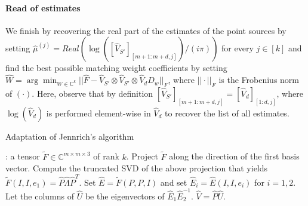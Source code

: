 \paragraph{Read of estimates} We finish by recovering the real part of the estimates of the point sources by setting $\widehat{\mu}^{(j)}=Real(\log([\widehat{V}_{S'}]_{[m+1:m+d,j]})/(i\pi))$ for every $j\in[k]$ and find the best possible matching weight coefficients by setting $\widehat{W}=\arg\min_{W\in\mathbb{C}^k}||\widehat{F}-\widehat{V}_{S'}\otimes\widehat{V}_{S'}\otimes \widehat{V}_dD_w||_F$, where $||\cdot||_F$ is the Frobenius norm of $(\cdot)$. Here, observe that by definition $[\widehat{V}_{S'}]_{[m+1:m+d,j]}=[\widehat{V}_d]_{[1:d,j]}$, where $\log(\widehat{V}_d)$ is performed element-wise in $\widehat{V}_d$ to recover the list of all estimates.
\begin{algorithm}
    \caption{Adaptation of Jennrich's algorithm}
    \label{alg:adapt_Jennrich}
    \begin{algorithmic}
        : a tensor $\widetilde{F}\in\mathbb{C}^{m\times m\times 3}$ of rank $k$.
        \State Project $\widetilde{F}$ along the direction of the first basis vector.
        \State Compute the truncated SVD of the above projection that yields $\widetilde{F}(I,I,e_1)=\widehat{P}\widehat{\Lambda}\widehat{P}^T$.
        \State Set $\widehat{E}=\widetilde{F}(P,P,I)$ and set $\widehat{E}_i=\widehat{E}(I,I,e_i)$ for $i=1,2$.
        \State Let the columns of $\widehat{U}$ be the eigenvectors of $\widehat{E}_1\widehat{E}_2^{-1}$.
         $\widehat{V}=\widehat{P}\widehat{U}$.
    \end{algorithmic}
\end{algorithm}
